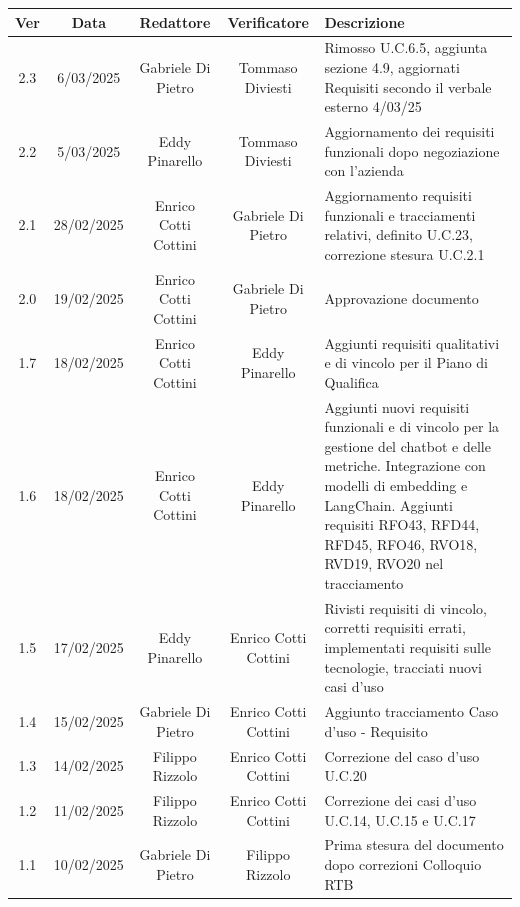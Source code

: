 \documentclass{article}
\begin{document}
\newpage
\begin{table}[h]
    \centering
    \renewcommand{\arraystretch}{1.2}
    \setlength{\tabcolsep}{5pt}
    \begin{tabular}{|c|c|c|c|m{}|}
        \hline
        \textbf{Ver} & \textbf{Data} & \textbf{Redattore} & \textbf{Verificatore} & \textbf{Descrizione} \\
        \hline
        2.3 & 6/03/2025 & Gabriele Di Pietro & Tommaso Diviesti & Rimosso U.C.6.5, aggiunta sezione 4.9, aggiornati Requisiti secondo il verbale esterno 4/03/25 \\
        \hline
        2.2 & 5/03/2025 & Eddy Pinarello & Tommaso Diviesti & Aggiornamento dei requisiti funzionali dopo negoziazione con l'azienda \\
        \hline
        2.1 & 28/02/2025 & Enrico Cotti Cottini & Gabriele Di Pietro &  Aggiornamento requisiti funzionali e tracciamenti relativi, definito U.C.23, correzione stesura U.C.2.1 \\
        \hline
        2.0 & 19/02/2025 & Enrico Cotti Cottini & Gabriele Di Pietro & Approvazione documento  \\
        \hline
        1.7 & 18/02/2025 & Enrico Cotti Cottini & Eddy Pinarello & Aggiunti requisiti qualitativi e di vincolo per il Piano di Qualifica \\
        \hline
        1.6 & 18/02/2025 & Enrico Cotti Cottini & Eddy Pinarello & Aggiunti nuovi requisiti funzionali e di vincolo per la gestione del chatbot e delle metriche. Integrazione con modelli di embedding e LangChain. Aggiunti requisiti RFO43, RFD44, RFD45, RFO46, RVO18, RVD19, RVO20 nel tracciamento \\
        \hline
        1.5 & 17/02/2025 & Eddy Pinarello & Enrico Cotti Cottini & Rivisti requisiti di vincolo, corretti requisiti errati, implementati requisiti sulle tecnologie, tracciati nuovi casi d'uso \\
        \hline
        1.4 & 15/02/2025 & Gabriele Di Pietro & Enrico Cotti Cottini & Aggiunto tracciamento Caso d'uso - Requisito \\
        \hline
        1.3 & 14/02/2025 & Filippo Rizzolo & Enrico Cotti Cottini & Correzione del caso d'uso U.C.20 \\
        \hline
        1.2 & 11/02/2025 & Filippo Rizzolo & Enrico Cotti Cottini & Correzione dei casi d'uso U.C.14, U.C.15 e U.C.17 \\
        \hline
        1.1 & 10/02/2025 & Gabriele Di Pietro & Filippo Rizzolo & Prima stesura del documento dopo correzioni Colloquio RTB \\

\end{tabular}
\end{table}
\end{document}
